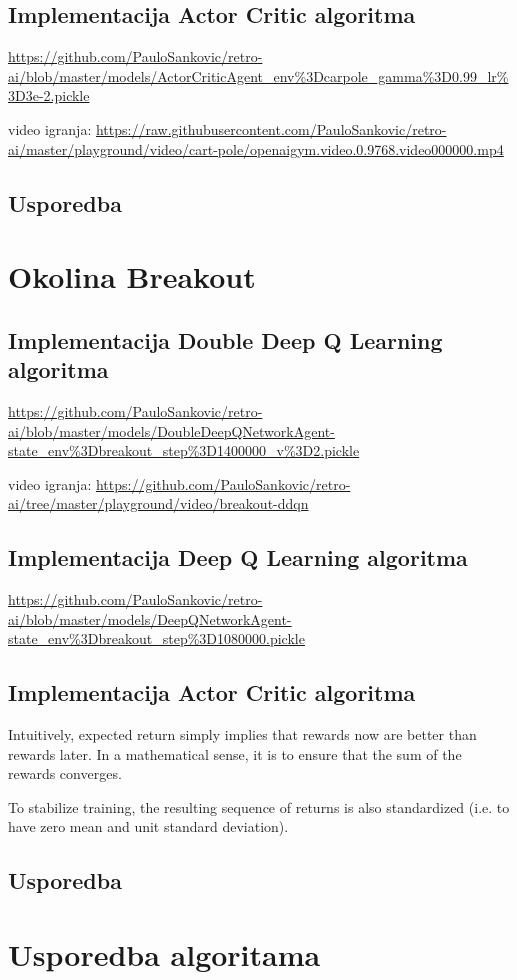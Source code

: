 \subsection{Implementacija Actor Critic algoritma}

\url{https://github.com/PauloSankovic/retro-ai/blob/master/models/ActorCriticAgent_env\%3Dcarpole_gamma\%3D0.99_lr\%3D3e-2.pickle}

video igranja:
\url{https://raw.githubusercontent.com/PauloSankovic/retro-ai/master/playground/video/cart-pole/openaigym.video.0.9768.video000000.mp4}

\subsection{Usporedba}

\section{Okolina Breakout}

\subsection{Implementacija Double Deep Q Learning algoritma}

\url{https://github.com/PauloSankovic/retro-ai/blob/master/models/DoubleDeepQNetworkAgent-state_env\%3Dbreakout_step\%3D1400000_v\%3D2.pickle}

video igranja:
\url{https://github.com/PauloSankovic/retro-ai/tree/master/playground/video/breakout-ddqn}

\subsection{Implementacija Deep Q Learning algoritma}

\url{https://github.com/PauloSankovic/retro-ai/blob/master/models/DeepQNetworkAgent-state_env\%3Dbreakout_step\%3D1080000.pickle}

\subsection{Implementacija Actor Critic algoritma}

Intuitively, expected return simply implies that rewards now are better than rewards later. In a mathematical sense, it is to ensure that the sum of the rewards converges.

To stabilize training, the resulting sequence of returns is also standardized (i.e. to have zero mean and unit standard deviation).

\subsection{Usporedba}

\section{Usporedba algoritama}

